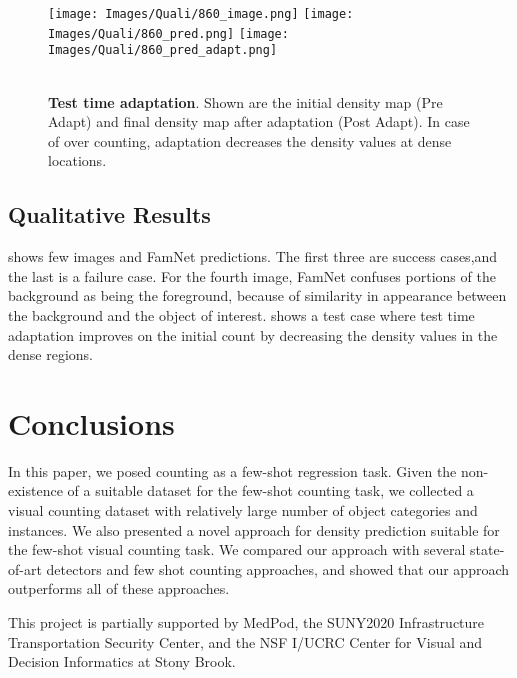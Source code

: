 \begin{figure}[h]  
\centering
{}
    \texttt{[image: Images/Quali/860\_image.png]}
    \texttt{[image: Images/Quali/860\_pred.png]}
        \texttt{[image: Images/Quali/860\_pred\_adapt.png]}\\    
\\ \vspace{2ex}
  \vskip -0.1in
  \caption{{\bf Test time adaptation}. Shown are the initial density map (Pre Adapt) and final density map after adaptation (Post Adapt). In case of over counting, adaptation decreases the density values at dense locations. }
  \label{fig:Qualitative2}
\end{figure}

\subsection{Qualitative Results}
 shows few images and FamNet predictions. The first three are success cases,and the last is a failure case. For the fourth image, FamNet confuses portions of the background as being the foreground, because of similarity in appearance between the background and the object of interest.  shows a test case where test time adaptation improves on the initial count by decreasing the density values in the dense regions.

\section{Conclusions}
In this paper, we posed counting as a few-shot regression task. Given the non-existence of a suitable dataset for the few-shot counting task, we collected a visual counting dataset with relatively large number of object categories and instances. We also presented a novel approach for density prediction suitable for the few-shot visual counting task. We compared our approach with several state-of-art detectors and few shot counting approaches, and showed that our approach outperforms all of these approaches.

 This project is partially supported by MedPod, the SUNY2020 Infrastructure Transportation Security Center, and the NSF I/UCRC Center for Visual and Decision Informatics at Stony Brook.

{\small
\setlength{\bibsep}{0pt}

}

